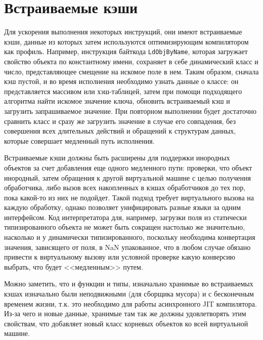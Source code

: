 \documentclass[times
,titlepage
]{itmo-student-thesis}
\begin{document}
\section{Встраиваемые кэши}
Для ускорения выполнения некоторых инструкций, они имеют встраиваемые кэши, данные из которых затем используются оптимизирующим компилятором как профиль. Например, инструкция байткода \texttt{LdObjByName}, которая загружает свойство объекта по константному имени, сохраняет в себе динамический класс и число, представляющее смещение на искомое поле в нем. Таким образом, сначала кэш пустой, и во время исполнения необходимо узнать данные о классе: он представляется массивом или хэш-таблицей, затем при помощи подходящего алгоритма найти искомое значение ключа, обновить встраиваемый кэш и загрузить запрашиваемое значение. При повторном выполнении будет достаточно сравнить класс и сразу же загрузить значение в случае его совпадения, без совершения всех длительных действий и обращений к структурам данных, которые совершает медленный путь исполнения.

Встраиваемые кэши должны быть расширены для поддержки инородных объектов за счет добавления еще одного медленного пути: проверки, что объект инородный, затем обращения к другой виртуальной машине с целью получения обработчика, либо вызов всех накопленных в кэшах обработчиков до тех пор, пока какой-то из них не подойдет. Такой подход требует виртуального вызова на каждую обработку, однако позволяет унифицировать разные языки за одним интерфейсом. Код интерпретатора для, например, загрузки поля из статически типизированного объекта не может быть сокращен настолько же значительно, насколько и у динамически типизированного, поскольку необходима конвертация значения, зависящего от поля, в NaN упакованное, что в любом случае обязано привести к виртуальному вызову или условной проверке какую конверсию выбрать, что будет <<медленным>> путем.

Можно заметить, что и функции и типы, изначально хранимые во встраиваемых кэшах изначально были неподвижными (для сборщика мусора) и с бесконечным временем жизни, т.к. это необходимо для работы асинхронного JIT компилятора. Из-за чего и новые данные, хранимые там так же должны удовлетворять этим свойствам, что добавляет новый класс корневых объектов ко всей виртуальной машине.
\end{document}
